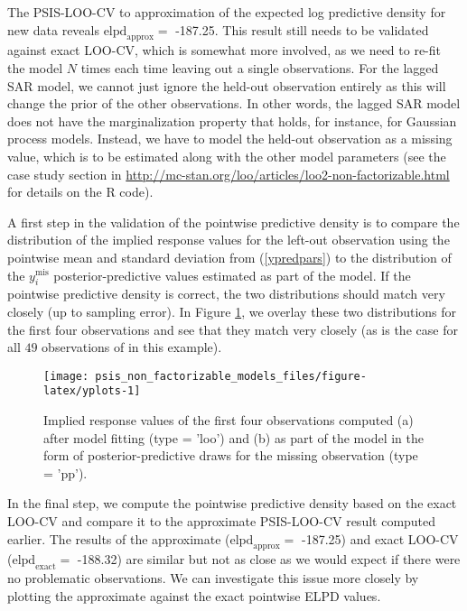 \documentclass[english,,doc,floatsintext]{apa6}
\theoremstyle{definition}
\theoremstyle{definition}
\theoremstyle{definition}
\theoremstyle{remark}
\begin{document}
The PSIS-LOO-CV to approximation of the expected log predictive density
for new data reveals \(\text{elpd}_{\text{approx}} =\) -187.25. This
result still needs to be validated against exact LOO-CV, which is
somewhat more involved, as we need to re-fit the model \(N\) times each
time leaving out a single observations. For the lagged SAR model, we
cannot just ignore the held-out observation entirely as this will change
the prior of the other observations. In other words, the lagged SAR
model does not have the marginalization property that holds, for
instance, for Gaussian process models. Instead, we have to model the
held-out observation as a missing value, which is to be estimated along
with the other model parameters (see the case study section in
\url{http://mc-stan.org/loo/articles/loo2-non-factorizable.html} for
details on the R code).

A first step in the validation of the pointwise predictive density is to
compare the distribution of the implied response values for the left-out
observation using the pointwise mean and standard deviation from
(\ref{ypredpars}) to the distribution of the \(y_i^{\mathrm{mis}}\)
posterior-predictive values estimated as part of the model. If the
pointwise predictive density is correct, the two distributions should
match very closely (up to sampling error). In Figure \ref{fig:yplots},
we overlay these two distributions for the first four observations and
see that they match very closely (as is the case for all \(49\)
observations of in this example).

\begin{figure}
\texttt{[image: psis\_non\_factorizable\_models\_files/figure-latex/yplots-1]} \caption{Implied response values of the first four observations computed (a) after model fitting (type = 'loo') and (b) as part of the model in the form of posterior-predictive draws for the missing observation (type = 'pp').}\label{fig:yplots}
\end{figure}

In the final step, we compute the pointwise predictive density based on
the exact LOO-CV and compare it to the approximate PSIS-LOO-CV result
computed earlier. The results of the approximate
(\(\text{elpd}_{\text{approx}} =\) -187.25) and exact LOO-CV
(\(\text{elpd}_{\text{exact}} =\) -188.32) are similar but not as close
as we would expect if there were no problematic observations. We can
investigate this issue more closely by plotting the approximate against
the exact pointwise ELPD values.
\end{document}
